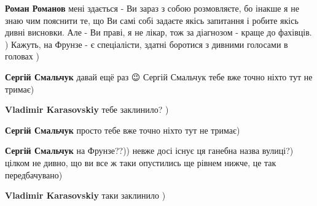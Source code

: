 \begin{itemize}
\begin{itemize}
\textbf{Роман Романов} мені здається - Ви зараз з собою розмовляєте, бо інакше я не знаю чим пояснити те, що Ви самі собі задаєте якісь запитання і робите якісь дивні висновки. Але - Ви праві, я не лікар, тож за діагнозом - краще до фахівців. ) Кажуть, на Фрунзе - є спеціалісти, здатні боротися з дивними голосами в головах )

 
\textbf{Сергій Смальчук} давай ещё раз 😉
Сергій Смальчук тебе вже точно ніхто тут не тримає)

 
\textbf{Vladimir Karasovskiy} тебе заклинило? )

 
\textbf{Сергій Смальчук} просто тебе вже точно ніхто тут не тримає)

 
\textbf{Сергій Смальчук} на Фрунзе??)) невже досі існує ця ганебна назва вулиці?) цілком не дивно, що ви все ж таки опустились ще рівнем нижче, це так передбачувано)

 
\textbf{Vladimir Karasovskiy} таки заклинило )

 

\end{itemize}
\end{itemize}
